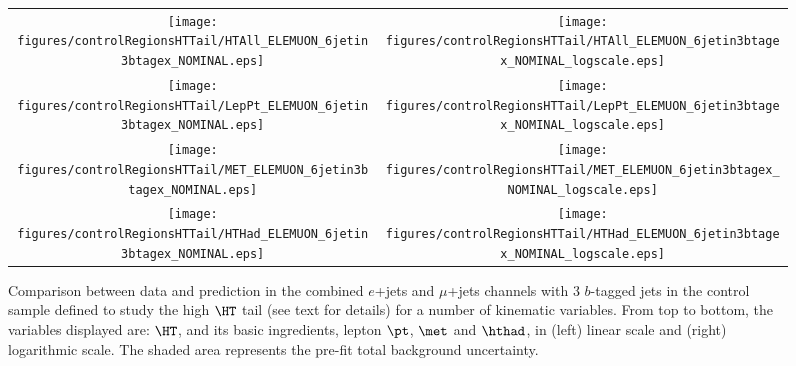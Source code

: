 \begin{figure}[htbp]
\begin{center}
\begin{tabular}{cc}
%
\texttt{[image: figures/controlRegionsHTTail/HTAll\_ELEMUON\_6jetin3btagex\_NOMINAL.eps]} &
\texttt{[image: figures/controlRegionsHTTail/HTAll\_ELEMUON\_6jetin3btagex\_NOMINAL\_logscale.eps]} \\
\texttt{[image: figures/controlRegionsHTTail/LepPt\_ELEMUON\_6jetin3btagex\_NOMINAL.eps]} &
\texttt{[image: figures/controlRegionsHTTail/LepPt\_ELEMUON\_6jetin3btagex\_NOMINAL\_logscale.eps]} \\
\texttt{[image: figures/controlRegionsHTTail/MET\_ELEMUON\_6jetin3btagex\_NOMINAL.eps]} &
\texttt{[image: figures/controlRegionsHTTail/MET\_ELEMUON\_6jetin3btagex\_NOMINAL\_logscale.eps]} \\
\texttt{[image: figures/controlRegionsHTTail/HTHad\_ELEMUON\_6jetin3btagex\_NOMINAL.eps]} &
\texttt{[image: figures/controlRegionsHTTail/HTHad\_ELEMUON\_6jetin3btagex\_NOMINAL\_logscale.eps]} \\

\end{tabular}\caption{\small {Comparison between data and prediction in the combined $e$+jets and $\mu$+jets channels with 3 $b$-tagged jets in the control sample
defined to study the high $\HT$ tail (see text for details)  for a number of kinematic
variables. From top to bottom, the variables displayed are: $\HT$, and its basic ingredients, lepton $\pt$, $\met$ and $\hthad$,
in (left) linear scale and (right) logarithmic scale.
The shaded area represents the pre-fit total background uncertainty.}}
\label{fig:ELEMUON_controlHTTail_3btagex_1}
\end{center}
\end{figure}
